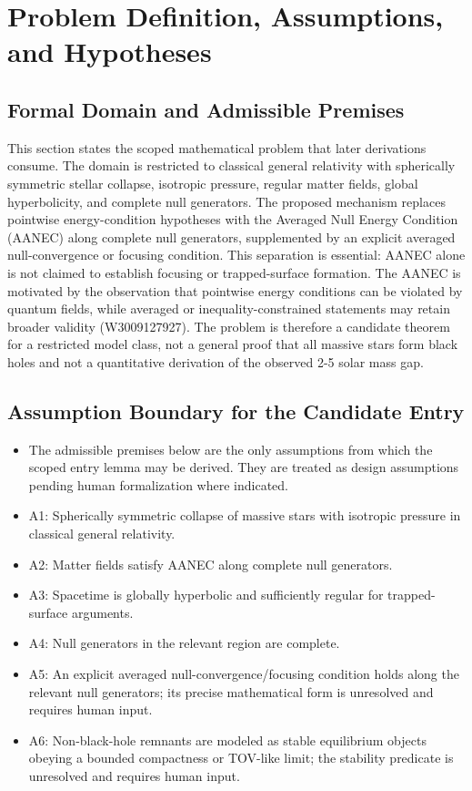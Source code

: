 \documentclass[conference]{IEEEtran}
\begin{document}
\section{Problem Definition, Assumptions, and Hypotheses}
\subsection{Formal Domain and Admissible Premises}
This section states the scoped mathematical problem that later derivations consume. The domain is restricted to classical general relativity with spherically symmetric stellar collapse, isotropic pressure, regular matter fields, global hyperbolicity, and complete null generators. The proposed mechanism replaces pointwise energy-condition hypotheses with the Averaged Null Energy Condition (AANEC) along complete null generators, supplemented by an explicit averaged null-convergence or focusing condition. This separation is essential: AANEC alone is not claimed to establish focusing or trapped-surface formation. The AANEC is motivated by the observation that pointwise energy conditions can be violated by quantum fields, while averaged or inequality-constrained statements may retain broader validity (W3009127927). The problem is therefore a candidate theorem for a restricted model class, not a general proof that all massive stars form black holes and not a quantitative derivation of the observed 2-5 solar mass gap.~\cite{cite_0ed84243cf171bc4}

\subsection{Assumption Boundary for the Candidate Entry}
\begin{itemize}
\item The admissible premises below are the only assumptions from which the scoped entry lemma may be derived. They are treated as design assumptions pending human formalization where indicated.
\item A1: Spherically symmetric collapse of massive stars with isotropic pressure in classical general relativity.
\item A2: Matter fields satisfy AANEC along complete null generators.
\item A3: Spacetime is globally hyperbolic and sufficiently regular for trapped-surface arguments.
\item A4: Null generators in the relevant region are complete.
\item A5: An explicit averaged null-convergence/focusing condition holds along the relevant null generators; its precise mathematical form is unresolved and requires human input.
\item A6: Non-black-hole remnants are modeled as stable equilibrium objects obeying a bounded compactness or TOV-like limit; the stability predicate is unresolved and requires human input.
\end{itemize}
\end{document}

